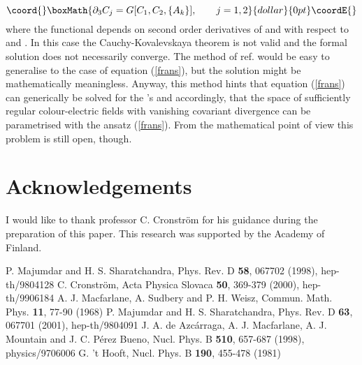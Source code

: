 \documentclass[a4paper,12pt]{article}
\begin{document}
$$\coord{}\boxMath{ \partial_3 C_j = G[C_1, C_2, \{A_k\}], \qquad j=1,2 }{dollar}{0pt}\coordE{}$$ 
where the functional \coordHE{} depends on second order derivatives of \coordHE{} and \coordHE{} with respect to \coordHE{} and \coordHE{}. In this case the Cauchy-Kovalevskaya theorem is not valid and the formal solution does not necessarily converge. The method of ref. \cite{ms2} would be easy to generalise to the case of equation (\ref{frans}), but the solution might be mathematically meaningless. Anyway, this method hints that equation (\ref{frans}) can generically be solved for the \coordHE{}'s and accordingly, that the space of sufficiently regular colour-electric fields with vanishing covariant divergence can be parametrised with the ansatz (\ref{frans}). From the mathematical point of view this problem is still open, though.

\section*{Acknowledgements}

I would like to thank professor C. Cronstr\"om for his guidance during the
preparation of this paper. This research was supported by the Academy of Finland.


\begin{thebibliography}{9}

 P. Majumdar and H. S. Sharatchandra, Phys. Rev. D {\bf 58},
067702 (1998), hep-th/9804128
 C. Cronstr\"om, Acta Physica Slovaca {\bf 50}, 369-379 (2000), hep-th/9906184
 A. J. Macfarlane, A. Sudbery and P. H. Weisz, Commun. Math. Phys.
{\bf 11}, 77-90 (1968)
 P. Majumdar and H. S. Sharatchandra, Phys. Rev. D {\bf 63},
067701 (2001), hep-th/9804091
 J. A. de Azc\'arraga, A. J. Macfarlane, A. J. Mountain and J. C. P\'erez Bueno, Nucl. Phys. B {\bf 510}, 657-687 (1998), physics/9706006
 G. 't Hooft, Nucl. Phys. B {\bf 190}, 455-478 (1981)

\end{thebibliography}
\end{document}
